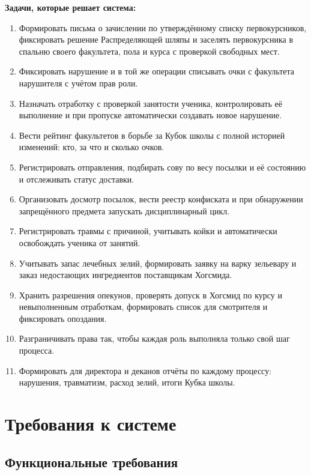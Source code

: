 \documentclass[a4paper,12pt]{article}
\begin{document}
\textbf{Задачи, которые решает система:}
\begin{enumerate}
  \item Формировать письма о зачислении по утверждённому списку первокурсников,
        фиксировать решение Распределяющей шляпы и заселять первокурсника
        в спальню своего факультета, пола и курса с проверкой свободных мест.
  \item Фиксировать нарушение и в той же операции списывать очки с факультета
        нарушителя с учётом прав роли.
  \item Назначать отработку с проверкой занятости ученика, контролировать её
        выполнение и при пропуске автоматически создавать новое нарушение.
  \item Вести рейтинг факультетов в борьбе за Кубок школы с полной историей
        изменений: кто, за что и сколько очков.
  \item Регистрировать отправления, подбирать сову по весу посылки и её
        состоянию и отслеживать статус доставки.
  \item Организовать досмотр посылок, вести реестр конфиската и при обнаружении
        запрещённого предмета запускать дисциплинарный цикл.
  \item Регистрировать травмы с причиной, учитывать койки и автоматически
        освобождать ученика от занятий.
  \item Учитывать запас лечебных зелий, формировать заявку на варку зельевару
        и заказ недостающих ингредиентов поставщикам Хогсмида.
  \item Хранить разрешения опекунов, проверять допуск в Хогсмид по курсу
        и невыполненным отработкам, формировать список для смотрителя
        и фиксировать опоздания.
  \item Разграничивать права так, чтобы каждая роль выполняла только свой шаг
        процесса.
  \item Формировать для директора и деканов отчёты по каждому процессу:
        нарушения, травматизм, расход зелий, итоги Кубка школы.
\end{enumerate}
 
\section{Требования к системе}
 
\subsection{Функциональные требования}
 
\end{document}
